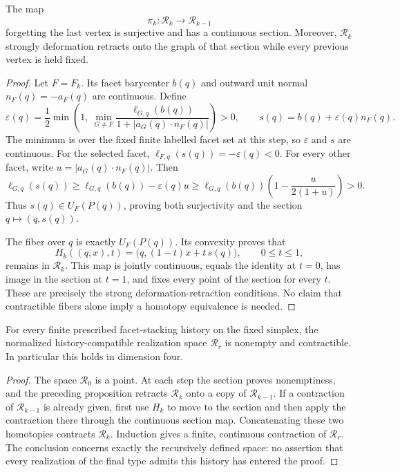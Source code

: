 \begin{proposition}
The map
\[
 \pi_k:\mathcal R_k\longrightarrow\mathcal R_{k-1}
\]
forgetting the last vertex is surjective and has a continuous section.
Moreover, \(\mathcal R_k\) strongly deformation retracts onto the graph of
that section while every previous vertex is held fixed.
\end{proposition}
\begin{proof}
Let \(F=F_k\). Its facet barycenter \(b(q)\) and outward unit normal
\(n_F(q)=-a_F(q)\) are continuous. Define
\[
 \varepsilon(q)=\frac12\min\left(
       1,\ \min_{G\ne F}
       \frac{\ell_{G,q}(b(q))}{1+|a_G(q)\cdot n_F(q)|}
                         \right)>0,
 \qquad s(q)=b(q)+\varepsilon(q)n_F(q).
\]
The minimum is over the fixed finite labelled facet set at this step, so
\(\varepsilon\) and \(s\) are continuous. For the selected facet,
\(\ell_{F,q}(s(q))=-\varepsilon(q)<0\). For every other facet, write
\(u=|a_G(q)\cdot n_F(q)|\). Then
\[
 \ell_{G,q}(s(q))
 \geq \ell_{G,q}(b(q))-\varepsilon(q)u
 \geq \ell_{G,q}(b(q))
             \left(1-\frac{u}{2(1+u)}\right)>0.
\]
Thus \(s(q)\in U_F(P(q))\), proving both surjectivity and the section
\(q\mapsto(q,s(q))\).

The fiber over \(q\) is exactly \(U_F(P(q))\). Its convexity proves that
\[
 H_k((q,x),t)=\bigl(q,(1-t)x+t\,s(q)\bigr),\qquad 0\leq t\leq1,
\]
remains in \(\mathcal R_k\). This map is jointly continuous, equals the
identity at \(t=0\), has image in the section at \(t=1\), and fixes every
point of the section for every \(t\). These are precisely the strong
deformation-retraction conditions. No claim that contractible fibers
alone imply a homotopy equivalence is needed.
\end{proof}

\begin{theorem}
For every finite prescribed facet-stacking history on the fixed simplex,
the normalized history-compatible realization space \(\mathcal R_r\) is
nonempty and contractible. In particular this holds in dimension four.
\end{theorem}
\begin{proof}
The space \(\mathcal R_0\) is a point. At each step the section proves
nonemptiness, and the preceding proposition retracts \(\mathcal R_k\)
onto a copy of \(\mathcal R_{k-1}\). If a contraction of
\(\mathcal R_{k-1}\) is already given, first use \(H_k\) to move to the
section and then apply the contraction there through the continuous
section map. Concatenating these two homotopies contracts
\(\mathcal R_k\). Induction gives a finite, continuous contraction of
\(\mathcal R_r\). The conclusion concerns exactly the recursively defined
space: no assertion that every realization of the final type admits
this history has entered the proof.
\end{proof}

